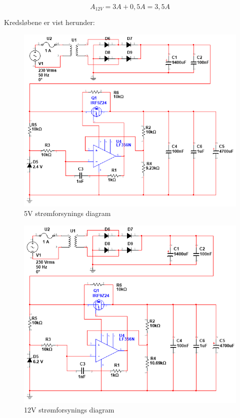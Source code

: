 \begin{equation}
	A_{12V} = 3A + 0,5A = 3,5A
\end{equation}

Kredsløbene er vist herunder:
\begin{figure}[H]
	\centering
	\includegraphics[scale=0.75]{../Hardware/PSU/PSU_5V}
	\caption{5V strømforsynings diagram}
	\label{photo:PSU_5V}
\end{figure}

\begin{figure}[H]
	\centering
	\includegraphics[scale=0.75]{../Hardware/PSU/PSU_12V}
	\caption{12V strømforsynings diagram}
	\label{photo:PSU_12V}
\end{figure}

